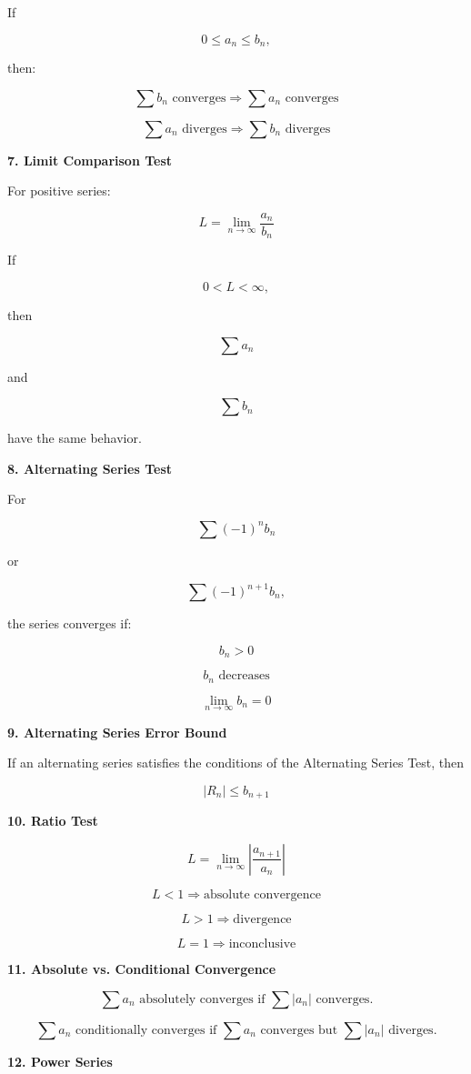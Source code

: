 \documentclass[11pt]{article}
\newcommand{\subtopic}[1]{
\vspace{0.45em}
\textcolor{novelPurpleDark}{\textbf{#1}}
}
\begin{document}
If

\[
0\le a_n\le b_n,
\]

then:

\[
\sum b_n \text{ converges} \Rightarrow \sum a_n \text{ converges}
\]

\[
\sum a_n \text{ diverges} \Rightarrow \sum b_n \text{ diverges}
\]

\subtopic{7. Limit Comparison Test}

For positive series:

\[
L=\lim_{n\to\infty}\frac{a_n}{b_n}
\]

If

\[
0<L<\infty,
\]

then

\[
\sum a_n
\]

and

\[
\sum b_n
\]

have the same behavior.

\subtopic{8. Alternating Series Test}

For

\[
\sum (-1)^n b_n
\]

or

\[
\sum (-1)^{n+1}b_n,
\]

the series converges if:

\[
b_n>0
\]

\[
b_n\text{ decreases}
\]

\[
\lim_{n\to\infty}b_n=0
\]

\subtopic{9. Alternating Series Error Bound}

If an alternating series satisfies the conditions of the Alternating Series Test, then

\[
|R_n|\le b_{n+1}
\]

\subtopic{10. Ratio Test}

\[
L=\lim_{n\to\infty}\left|\frac{a_{n+1}}{a_n}\right|
\]

\[
L<1 \Rightarrow \text{absolute convergence}
\]

\[
L>1 \Rightarrow \text{divergence}
\]

\[
L=1 \Rightarrow \text{inconclusive}
\]

\subtopic{11. Absolute vs. Conditional Convergence}

\[
\sum a_n \text{ absolutely converges if } \sum |a_n| \text{ converges.}
\]

\[
\sum a_n \text{ conditionally converges if } \sum a_n \text{ converges but } \sum |a_n| \text{ diverges.}
\]

\subtopic{12. Power Series}
\end{document}
